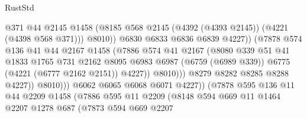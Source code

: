 \begin{lexlean}{RustStd}
\begin{coremodule}
                                      @371
                                      @44
                                      @2145
                                      @1458
                                      (@8185
                                        @568
                                        @2145
                                        (@4392 (@4393 @2145))
                                        (@4221 (@4398 @568 @371)))
                                      @8010))
                                  @6830
                                  @6833
                                  @6836
                                  @6839
                                  @4227))
                              (@7878
                                @574
                                @136
                                @41
                                @44
                                @2167
                                @1458
                                (@7886
                                  @574
                                  @41
                                  @2167
                                  (@8080
                                    @339
                                    @51
                                    @41
                                    @1833
                                    @1765
                                    @731
                                    @2162
                                    @8095
                                    @6983
                                    @6987
                                    (@6759 (@6989 @339))
                                    @6775
                                    (@4221 (@6777 @2162 @2151))
                                    @4227))
                                @8010)))
                          @8279
                          @8282
                          @8285
                          @8288
                          @4227))
                      @8010)))
                @6062
                @6065
                @6068
                @6071
                @4227))
            (@7878
              @595
              @136
              @11
              @44
              @2209
              @1458
              (@7886
                @595
                @11
                @2209
                (@8148
                  @594
                  @669
                  @11
                  @1464
                  @2207
                  @1278
                  @687
                  (@7873
                    @594
                    @669
                    @2207

\end{coremodule}
\end{lexlean}
